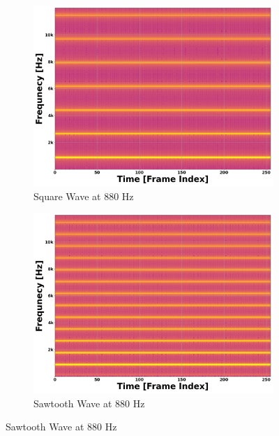 \documentclass[12pt,letterpaper]{article}
\begin{document}
\begin{figure}[H]
	\begin{subfigure}{0.45\textwidth}
	\centering
	\includegraphics[scale=0.2]{../FiguresSpectrogram/SquareWave-880Hz}
	\caption{Square Wave at $880$ Hz}
	\end{subfigure}
	\begin{subfigure}{0.45\textwidth}
	\centering
	\includegraphics[scale=0.2]{../FiguresSpectrogram/SawtoothWave-880Hz}
	\caption{Sawtooth Wave at $880$ Hz}
	\end{subfigure}
	

\end{figure}
\end{document}
